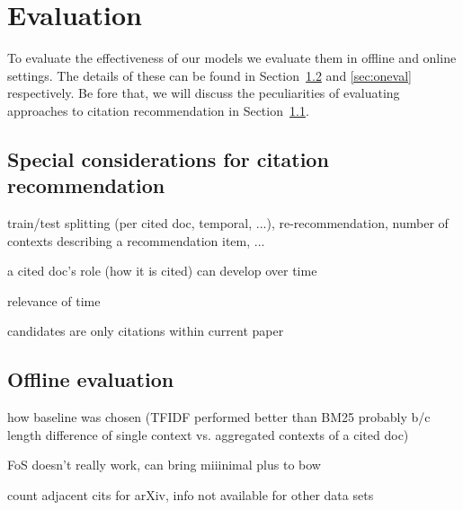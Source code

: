 \chapter{Evaluation}\label{chap:evaluation}
To evaluate the effectiveness of our models we evaluate them in offline and online settings. The details of these can be found in Section~\ref{sec:offeval} and \ref{sec:oneval} respectively. Be fore that, we will discuss the peculiarities of evaluating approaches to citation recommendation in Section~\ref{sec:citrecspecial}.

\section{Special considerations for citation recommendation}\label{sec:citrecspecial}
train/test splitting (per cited doc, temporal, ...), re-recommendation, number of contexts describing a recommendation item, ...

a cited doc's role (how it is cited) can develop over time\cite{Swales1986,He2018}

relevance of time\cite{Beel2017a}

candidates are only citations within current paper\cite{Duma2014}

\section{Offline evaluation}\label{sec:offeval}

how baseline was chosen (TFIDF performed better than BM25 probably b/c length difference of single context vs. aggregated contexts of a cited doc)

FoS doesn't really work, can bring miiinimal plus to bow

count adjacent cits for arXiv, info not available for other data sets




